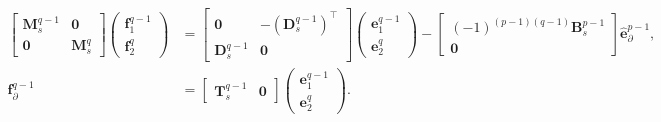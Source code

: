 \documentclass{elsarticle}
\newcommand*{\dual}[1]{\ensuremath{\widehat{#1}}}
\begin{document}
{\begin{equation}\label{eq:alg_dual}
\begin{aligned}
    \begin{bmatrix}
        \mathbf{M}^{q-1}_s & \mathbf{0} \\
        \mathbf{0} & \mathbf{M}^q_s
    \end{bmatrix}
    \begin{pmatrix}
    \mathbf{f}^{q-1}_1 \\
    \mathbf{f}^q_2
    \end{pmatrix} &=
    \begin{bmatrix}
        \mathbf{0} & -(\mathbf{D}_s^{q-1})^\top \\
        \mathbf{D}^{q-1}_s & \mathbf{0}
    \end{bmatrix}
    \begin{pmatrix}
    \mathbf{e}^{q-1}_1 \\
    \mathbf{e}^q_2
    \end{pmatrix} - 
    \begin{bmatrix}
        (-1)^{(p-1)(q-1)}\mathbf{B}_s^{p-1}\\
        \mathbf{0}
    \end{bmatrix}\dual{\mathbf{e}}^{p-1}_\partial, \\
    \mathbf{f}_\partial^{q-1} &= \begin{bmatrix}
        \mathbf{T}_s^{q-1} & \mathbf{0}
    \end{bmatrix}\begin{pmatrix}
    \mathbf{e}^{q-1}_1 \\
    \mathbf{e}^q_2
    \end{pmatrix}.
\end{aligned}
\end{equation}



}
\end{document}
